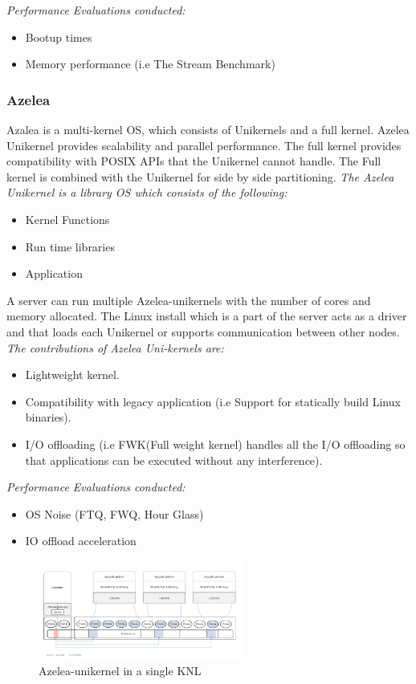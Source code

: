 \emph{Performance Evaluations conducted:}
\begin{itemize}
  \item Bootup times 
  \item Memory performance (i.e The Stream Benchmark)
\end{itemize}

\subsubsection{Azelea}
Azalea\cite{Azelea} is a multi-kernel OS, which consists of Unikernels and a full kernel. Azelea Unikernel provides scalability and parallel performance. 
The full kernel provides compatibility with POSIX APIs that the Unikernel cannot handle. The Full kernel is combined with the Unikernel for 
side by side partitioning. \emph{The Azelea Unikernel is a library OS which consists of the following:}
\begin{itemize}
  \item Kernel Functions 
  \item Run time libraries 
  \item Application 
\end{itemize}
A server can run multiple Azelea-unikernels with the number of cores and memory allocated. The Linux install which is a part of 
the server acts as a driver and that loads each Unikernel or supports communication between other nodes. 
\emph{The contributions of Azelea Uni-kernels are:}
\begin{itemize}
  \item Lightweight kernel.
  \item Compatibility with legacy application (i.e Support for statically build Linux binaries).
  \item I/O offloading (i.e FWK(Full weight kernel) handles all the I/O offloading so that applications can be executed without any interference). 
\end{itemize}

\emph{Performance Evaluations conducted:}
\begin{itemize}
  \item OS Noise (FTQ, FWQ, Hour Glass) \cite{AzeleaOSNoise}
  \item IO offload acceleration \cite{AzeleaIOAccerleration}
\end{itemize}

\begin{figure}[htbp!] 
  \centering    
  \includegraphics[width=0.6\textwidth]{AzeleaKNL}
  \caption[Azelea]{Azelea-unikernel in a single KNL \cite{Azelea}}
  \label{fig:AzeleaKNL}
  \end{figure}

